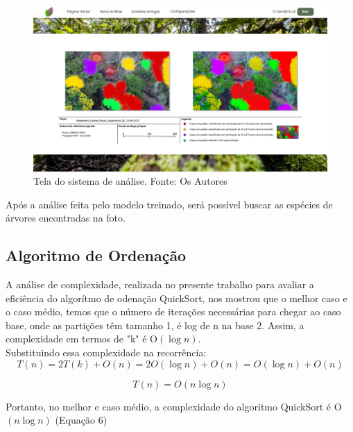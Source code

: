 \documentclass[
  a4paper,%
  12pt,%
  english,%
  brazilian,%
]{article}
\begin{document}
\begin{figure}[H]
    \centering
    \includegraphics[width=\textwidth,keepaspectratio]{Logos/tela_diagnostico_detalhado_novo.png}
    \caption{Tela do sistema de análise. Fonte: Os Autores}
    \label{fig:my_label}
\end{figure}

Após a análise feita pelo modelo treinado, será possível buscar as espécies de árvores encontradas na foto.


\subsection*{Algoritmo de Ordenação}
    

A análise de complexidade, realizada no presente trabalho para avaliar a eficiência do algorítmo de odenação QuickSort, nos mostrou que o melhor caso e o caso médio, temos que o número de iterações necessárias para chegar ao caso base, onde as partições têm tamanho 1, é log de n na base 2. Assim, a complexidade em termos de "k" é O$(\log n)$.\\

Substituindo essa complexidade na recorrência:\\

\begin{equation} 
\label{eu_eqn1}
        T(n) = 2T(k) + O(n) = 2O(\log n) + O(n) = O(\log n) + O(n)
\end{equation}

\begin{equation} 
    \label{eu_eqn}    
        T(n)= O(n \log n)
\end{equation}

Portanto, no melhor e caso médio, a complexidade do algoritmo QuickSort é O$(n \log n)$ (Equação 6)\\
\end{document}
